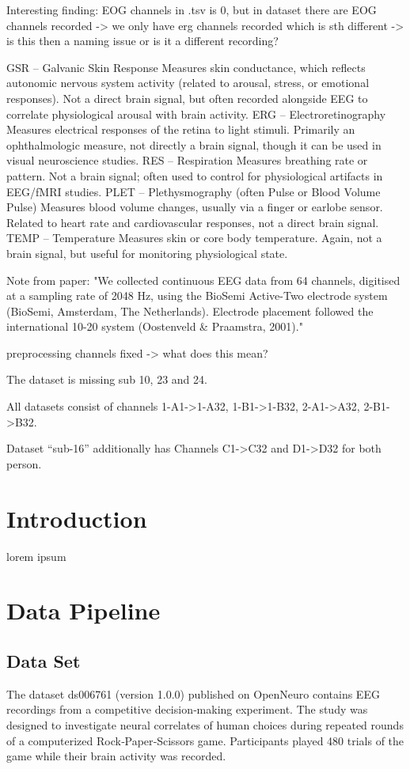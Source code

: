 \documentclass{article}
\theoremstyle{plain}
\theoremstyle{definition}
\theoremstyle{remark}
\begin{document}
Interesting finding: EOG channels in .tsv is 0, but in dataset there are EOG channels recorded -> we only have erg channels recorded which is sth different -> is this then a naming issue or is it a different recording?


GSR – Galvanic Skin Response
Measures skin conductance, which reflects autonomic nervous system activity (related to arousal, stress, or emotional responses).
Not a direct brain signal, but often recorded alongside EEG to correlate physiological arousal with brain activity.
ERG – Electroretinography
Measures electrical responses of the retina to light stimuli.
Primarily an ophthalmologic measure, not directly a brain signal, though it can be used in visual neuroscience studies.
RES – Respiration
Measures breathing rate or pattern.
Not a brain signal; often used to control for physiological artifacts in EEG/fMRI studies.
PLET – Plethysmography (often Pulse or Blood Volume Pulse)
Measures blood volume changes, usually via a finger or earlobe sensor.
Related to heart rate and cardiovascular responses, not a direct brain signal.
TEMP – Temperature
Measures skin or core body temperature.
Again, not a brain signal, but useful for monitoring physiological state.


Note from paper: "We collected continuous EEG data from 64 channels, digitised at a sampling rate of 2048 Hz,
using the BioSemi Active-Two electrode system (BioSemi, Amsterdam, The Netherlands).
Electrode placement followed the international 10-20 system (Oostenveld \& Praamstra, 2001)."


preprocessing channels fixed -> what does this mean?

The dataset is missing sub 10, 23 and 24.

All datasets consist of channels 1-A1->1-A32, 1-B1->1-B32, 2-A1->A32, 2-B1->B32.

Dataset ``sub-16'' additionally has Channels C1->C32 and D1->D32 for both person.
\section{Introduction}
lorem ipsum


\section{Data Pipeline}

\subsection{Data Set}
The dataset ds006761 (version 1.0.0) published on OpenNeuro contains EEG recordings from a competitive decision‑making experiment. The study was designed to investigate neural correlates of human choices during repeated rounds of a computerized Rock‑Paper‑Scissors game. Participants played 480 trials of the game while their brain activity was recorded.
\end{document}
